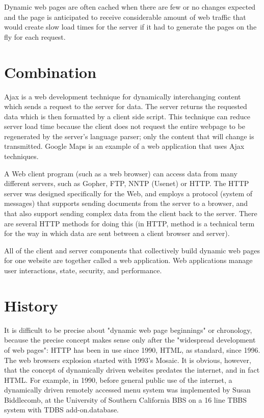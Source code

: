 Dynamic web pages are often cached when there are few or no changes expected and the page is anticipated to receive considerable amount of web traffic that would create slow load times for the server if it had to generate the pages on the fly for each request.






\section{Combination}

Ajax is a web development technique for dynamically interchanging content which sends a request to the server for data. The server returns the requested data which is then formatted by a client side script. This technique can reduce server load time because the client does not request the entire webpage to be regenerated by the server's language parser; only the content that will change is transmitted. Google Maps is an example of a web application that uses Ajax techniques.

A Web client program (such as a web browser) can access data from many different servers, such as Gopher, FTP, NNTP (Usenet) or HTTP. The HTTP server was designed specifically for the Web, and employs a protocol (system of messages) that supports sending documents from the server to a browser, and that also support sending complex data from the client back to the server. There are several HTTP methods for doing this (in HTTP, method is a technical term for the way in which data are sent between a client browser and server).

All of the client and server components that collectively build dynamic web pages for one website are together called a web application. Web applications manage user interactions, state, security, and performance.






\section{History}


It is difficult to be precise about "dynamic web page beginnings" or chronology, because the precise concept makes sense only after the "widespread development of web pages": HTTP has been in use since 1990, HTML, as standard, since 1996. The web browsers explosion started with 1993's Mosaic. It is obvious, however, that the concept of dynamically driven websites predates the internet, and in fact HTML. For example, in 1990, before general public use of the internet, a dynamically driven remotely accessed menu system was implemented by Susan Biddlecomb, at the University of Southern California BBS on a 16 line TBBS system with TDBS add-on.database.

